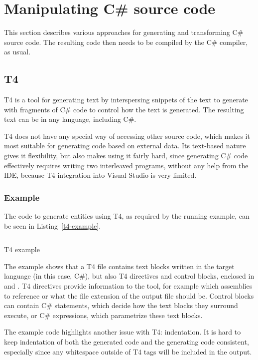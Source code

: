 \section{Manipulating C\# source code}

This section describes various approaches for generating and transforming C\# source code. The resulting code then needs to be compiled by the C\# compiler, as usual.

\subsection{\acs{T4}}

\ac{T4} \cite{T4} is a tool for generating text by interspersing snippets of the text to generate with fragments of C\# code to control how the text is generated. The resulting text can be in any language, including C\#.

\ac{T4} does not have any special way of accessing other source code, which makes it most suitable for generating code based on external data. Its text-based nature gives it flexibility, but also makes using it fairly hard, since generating C\# code effectively requires writing two interleaved programs, without any help from the \ac{IDE}, because \ac{T4} integration into Visual Studio is very limited.

\subsubsection{Example}

The code to generate entities using \ac{T4}, as required by the running example, can be seen in Listing~\ref{t4-example}.

\begin{listing}
\inputminted{text}{samples/T4/Entities.tt}
\caption{\ac{T4} example}
\label{t4-example}
\end{listing}

The example shows that a \ac{T4} file contains text blocks written in the target language (in this case, C\#), but also \ac{T4} directives and control blocks, enclosed in \cs{<#} and \cs{#>}. \ac{T4} directives provide information to the tool, for example which assemblies to reference or what the file extension of the output file should be. Control blocks can contain C\# statements, which decide how the text blocks they surround execute, or C\# expressions, which parametrize these text blocks.

The example code highlights another issue with \ac{T4}: indentation. It is hard to keep indentation of both the generated code and the generating code consistent, especially since any whitespace outside of \ac{T4} tags will be included in the output.

